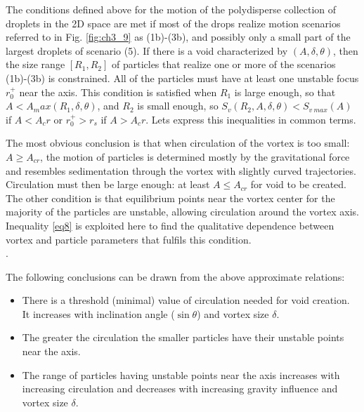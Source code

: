 \documentclass[../main.tex]{subfiles}
\begin{document}
The conditions defined above for the motion of the polydisperse collection of droplets in the 2D space are met if most of the drops realize motion scenarios referred to in Fig. \autoref{fig:ch3_9} as (1b)-(3b), and possibly only a small part of the largest droplets of scenario (5). If there is a void characterized by $(A,\delta,\theta)$, then the size range $[R_1,R_2]$ of particles that realize one or more of the scenarios (1b)-(3b) is constrained. All of the particles must have at least one unstable focus $r^+_0$ near the axis. This condition is  satisfied when $R_1$ is large enough, so that $A<A_max(R_1,\delta,\theta)$, and $R_2$ is small enough, so $S_v(R_2,A, \delta,\theta)<S_{v\ max}(A)$ if $A<A_cr$ or $r^+_0>r_s$ if $A>A_cr$. Lets express this inequalities in common terms.




The most obvious conclusion is that when circulation of the vortex is too small: $A \geq A_{cr}$,  the motion of particles is determined mostly by the gravitational force and resembles sedimentation through the vortex with slightly curved trajectories. Circulation must then be large enough: at least $A \leq A_{cr}$ for void to be created.\\
The other condition is that equilibrium points near the vortex center for the majority of the particles are unstable, allowing circulation around the vortex axis. Inequality \ref{eq8} is exploited here to find the qualitative dependence between vortex and particle parameters that fulfils this condition.\\
.

\noindent The following conclusions can be drawn from the above approximate relations:

\begin{itemize}
\item There is a threshold (minimal) value of circulation needed for void creation. It increases with inclination angle ($\sin \theta$) and vortex size $\delta$.
\item The greater the circulation the smaller particles  have their unstable points near the axis.
\item The range of particles having unstable points near the axis increases with increasing circulation and decreases with increasing gravity influence and vortex size $\delta$.
\end{itemize}
\end{document}

